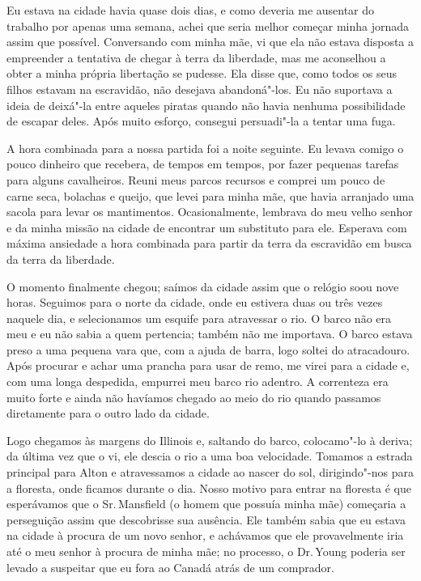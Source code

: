 Eu estava na cidade havia quase dois dias, e como deveria me ausentar do
trabalho por apenas uma semana, achei que seria melhor começar minha
jornada assim que possível. Conversando com minha mãe, vi que ela não
estava disposta a empreender a tentativa de chegar à terra da liberdade,
mas me aconselhou a obter a minha própria libertação se pudesse. Ela
disse que, como todos os seus filhos estavam na escravidão, não desejava
abandoná"-los. Eu não suportava a ideia de deixá"-la entre aqueles piratas
quando não havia nenhuma possibilidade de escapar deles. Após muito
esforço, consegui persuadi"-la a tentar uma fuga.

A hora combinada para a nossa partida foi a noite seguinte. Eu levava
comigo o pouco dinheiro que recebera, de tempos em tempos, por fazer
pequenas tarefas para alguns cavalheiros. Reuni meus parcos recursos e
comprei um pouco de carne seca, bolachas e queijo, que levei para minha
mãe, que havia arranjado uma sacola para levar os mantimentos.
Ocasionalmente, lembrava do meu velho senhor e da minha missão na cidade
de encontrar um substituto para ele. Esperava com máxima ansiedade a
hora combinada para partir da terra da escravidão em busca da terra da
liberdade.

O momento finalmente chegou; saímos da cidade assim que o relógio soou
nove horas. Seguimos para o norte da cidade, onde eu estivera duas ou
três vezes naquele dia, e selecionamos um esquife para atravessar o rio.
O barco não era meu e eu não sabia a quem pertencia; também não me
importava. O barco estava preso a uma pequena vara que, com a ajuda de
barra, logo soltei do atracadouro. Após procurar e achar uma prancha
para usar de remo, me virei para a cidade e, com uma longa despedida,
empurrei meu barco rio adentro. A correnteza era muito forte e ainda não
havíamos chegado ao meio do rio quando passamos diretamente para o outro
lado da cidade.

Logo chegamos às margens do Illinois e, saltando do barco, colocamo"-lo à
deriva; da última vez que o vi, ele descia o rio a uma boa velocidade.
Tomamos a estrada principal para Alton e atravessamos a cidade ao nascer
do sol, dirigindo"-nos para a floresta, onde ficamos durante o dia. Nosso
motivo para entrar na floresta é que esperávamos que o Sr.\,Mansfield (o
homem que possuía minha mãe) começaria a perseguição assim que
descobrisse sua ausência. Ele também sabia que eu estava na cidade à
procura de um novo senhor, e achávamos que ele provavelmente iria até o
meu senhor à procura de minha mãe; no processo, o Dr.\,Young poderia ser
levado a suspeitar que eu fora ao Canadá atrás de um comprador.

